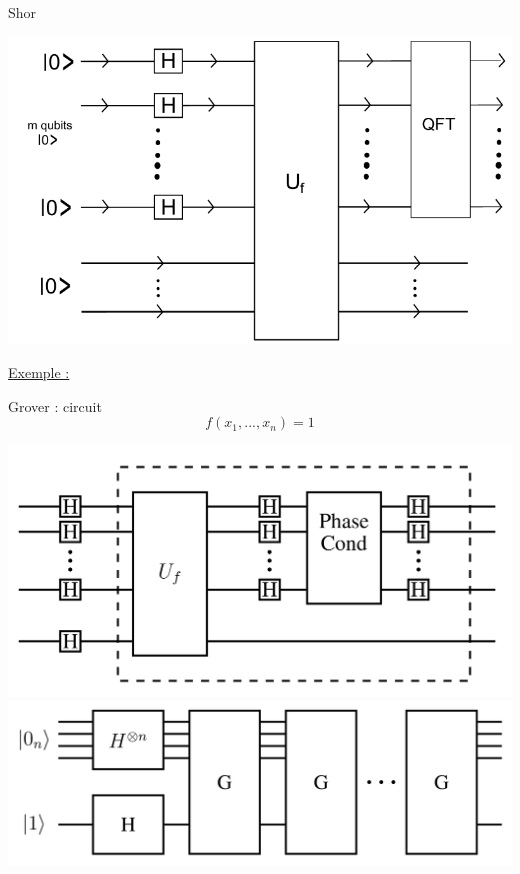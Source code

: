 \documentclass[french]{beamer}
\begin{document}
\begin{frame}{Shor}
    \begin{center}
        \includegraphics[scale=0.25]{Fabrice.png}
    \end{center}
    \underline{Exemple :} %
\end{frame}


\begin{frame}{Grover : circuit}
    $$f(x_1, ..., x_n) = 1$$
    \begin{center}
        \includegraphics[scale=0.08]{PorteGrover.png}
        \includegraphics[scale=0.08]{CircuitGrover.png}
    \end{center}
\end{frame}
\end{document}
